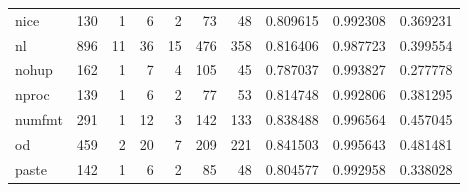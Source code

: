 \begin{tabular}{lrrrrrrrrr}
nice      &                    130 &                                  1 &                                 6 &                                2 &                                73 &                              48 &                                0.809615 &                               0.992308 &                             0.369231 \\
nl        &                    896 &                                 11 &                                36 &                               15 &                               476 &                             358 &                                0.816406 &                               0.987723 &                             0.399554 \\
nohup     &                    162 &                                  1 &                                 7 &                                4 &                               105 &                              45 &                                0.787037 &                               0.993827 &                             0.277778 \\
nproc     &                    139 &                                  1 &                                 6 &                                2 &                                77 &                              53 &                                0.814748 &                               0.992806 &                             0.381295 \\
numfmt    &                    291 &                                  1 &                                12 &                                3 &                               142 &                             133 &                                0.838488 &                               0.996564 &                             0.457045 \\
od        &                    459 &                                  2 &                                20 &                                7 &                               209 &                             221 &                                0.841503 &                               0.995643 &                             0.481481 \\
paste     &                    142 &                                  1 &                                 6 &                                2 &                                85 &                              48 &                                0.804577 &                               0.992958 &                             0.338028 \\

\end{tabular}
